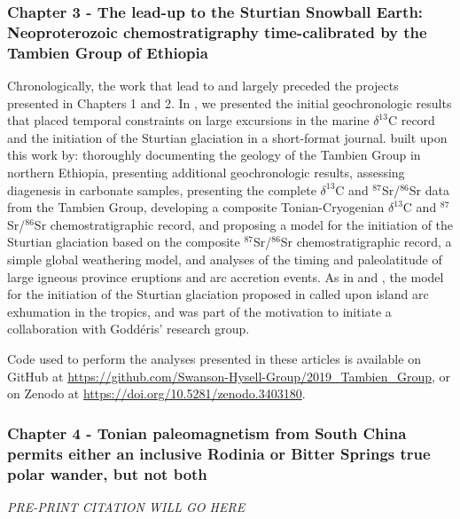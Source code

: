 \documentclass{ucbthesis}
\newcommand{\dC}{$\delta^{13}$C\xspace}
\newcommand{\SrSr}{$^{87}$Sr/$^{86}$Sr\xspace}
\begin{document}
\begin{frontmatter}
\begin{preface}
\subsubsection*{Chapter 3 - The lead-up to the Sturtian Snowball Earth: Neoproterozoic chemostratigraphy time-calibrated by the Tambien Group of Ethiopia}

\noindent
{}

\medskip

\noindent
{}

\bigskip

Chronologically, the work that lead to \citet{MacLennan2018a} and \citet{Park2020a} largely preceded the projects presented in Chapters 1 and 2. In \citet{MacLennan2018a}, we presented the initial geochronologic results that placed temporal constraints on large excursions in the marine \dC record and the initiation of the Sturtian glaciation in a short-format journal. \citet{Park2020a} built upon this work by: thoroughly documenting the geology of the Tambien Group in northern Ethiopia, presenting additional geochronologic results, assessing diagenesis in carbonate samples, presenting the complete \dC and \SrSr data from the Tambien Group, developing a composite Tonian-Cryogenian \dC and \SrSr chemostratigraphic record, and proposing a model for the initiation of the Sturtian glaciation based on the composite \SrSr chemostratigraphic record, a simple global weathering model, and analyses of the timing and paleolatitude of large igneous province eruptions and arc accretion events. As in \citet{Swanson-Hysell2017a} and \citet{Macdonald2019a}, the model for the initiation of the Sturtian glaciation proposed in \citet{Park2020a} called upon island arc exhumation in the tropics, and was part of the motivation to initiate a collaboration with Godd\'eris' research group.

Code used to perform the analyses presented in these articles is available on GitHub at \url{https://github.com/Swanson-Hysell-Group/2019_Tambien_Group}, or on Zenodo at \url{https://doi.org/10.5281/zenodo.3403180}.

\subsubsection*{Chapter 4 - Tonian paleomagnetism from South China permits either an inclusive Rodinia or Bitter Springs true polar wander, but not both}

\noindent
\textit{PRE-PRINT CITATION WILL GO HERE}


\end{preface}
\end{frontmatter}
\end{document}
